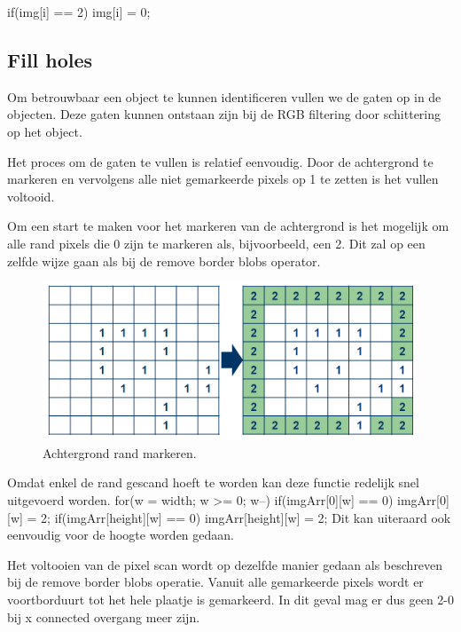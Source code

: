 if(img[i] == 2){
    img[i] = 0;
}

\subsection{Fill holes}
\label{sub:fillholes}
Om betrouwbaar een object te kunnen identificeren vullen we de gaten op in de 
objecten. Deze gaten kunnen ontstaan zijn bij de RGB filtering door schittering 
op het object.

Het proces om de gaten te vullen is relatief eenvoudig. Door de achtergrond te 
markeren en vervolgens alle niet gemarkeerde pixels op 1 te zetten is het vullen 
voltooid.

Om een start te maken voor het markeren van de achtergrond is het mogelijk om 
alle rand pixels die 0 zijn te markeren als, bijvoorbeeld, een 2. Dit zal op een 
zelfde wijze gaan als bij de remove border blobs operator.

\begin{figure}
    \begin{center}
        \includegraphics[scale=0.5]{figures/fill_holes_step1.png}
    \end{center}
    \caption{Achtergrond rand markeren.}
    \label{fig:fhstep1}
\end{figure}

Omdat enkel de rand gescand hoeft te worden kan deze functie redelijk snel 
uitgevoerd worden.
for(w = width; w >= 0; w--){
	if(imgArr[0][w] == 0){
        imgArr[0][w] = 2;
    }
    if(imgArr[height][w] == 0){
        imgArr[height][w] = 2;
    }
}
Dit kan uiteraard ook eenvoudig voor de hoogte worden gedaan.

Het voltooien van de pixel scan wordt op dezelfde manier gedaan als beschreven 
bij de remove border blobs operatie. Vanuit alle gemarkeerde pixels wordt er 
voortborduurt tot het hele plaatje is gemarkeerd. In dit geval mag er dus geen 
2-0 bij x connected overgang meer zijn.

